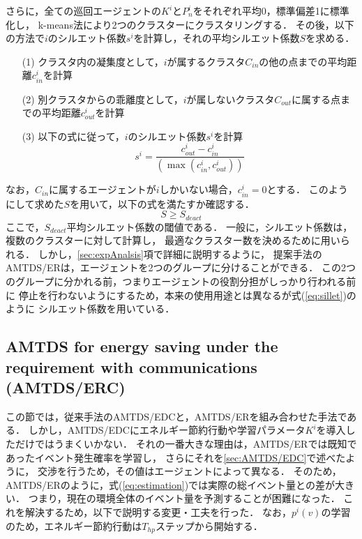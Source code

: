 \documentclass[12pt,a4j,twoside]{jarticle}
\begin{document}
  さらに，全ての巡回エージェントの$K^i$と$P^i_n$をそれぞれ平均0，標準偏差1に標準化し，
  k-means法により2つのクラスターにクラスタリングする．
  その後，以下の方法で$i$のシルエット係数$s^i$を計算し，それの平均シルエット係数$S$を求める．
  \begin{enumerate}
    \item[(1)] クラスタ内の凝集度として，$i$が属するクラスタ$C_{in}$の他の点までの平均距離$c^i_{in}$を計算
    \item[(2)] 別クラスタからの乖離度として，$i$が属しないクラスタ$C_{out}$に属する点までの平均距離$c^i_{out}$を計算
    \item[(3)] 以下の式に従って，$i$のシルエット係数$s^i$を計算
                \begin{equation}
                  s^i = \dfrac{c^i_{out} - c^i_{in}}{(\max(c^i_{in}, c^i_{out}))}
                \end{equation}
  \end{enumerate}
  なお，$C_{in}$に属するエージェントが$i$しかいない場合，$c^i_{in} = 0$とする．
  このようにして求めた$S$を用いて，以下の式を満たすか確認する．
    \begin{equation}\label{eq:sillet}
      S \geq S_{deact}
    \end{equation}
  ここで，$S_{deact}$平均シルエット係数の閾値である．
  一般に，シルエット係数は，複数のクラスターに対して計算し，
  最適なクラスター数を決めるために用いられる．
  しかし，\ref{sec:expAnalsis}項で詳細に説明するように，
  提案手法のAMTDS/ERは，エージェントを2つのグループに分けることができる．
  この2つのグループに分かれる前，つまりエージェントの役割分担がしっかり行われる前に
  停止を行わないようにするため，本来の使用用途とは異なるが式(\ref{eq:sillet})のように
  シルエット係数を用いている．
 
  \subsection{AMTDS for energy saving under the requirement with communications (AMTDS/ERC)}
  この節では，従来手法のAMTDS/EDCと，AMTDS/ERを組み合わせた手法である．
  しかし，AMTDS/EDCにエネルギー節約行動や学習パラメータ$K^i$を導入しただけではうまくいかない．
  それの一番大きな理由は，AMTDS/ERでは既知であったイベント発生確率を学習し，
  さらにそれを\ref{sec:AMTDS/EDC}で述べたように，
  交渉を行うため，その値はエージェントによって異なる．
  そのため，AMTDS/ERのように，式(\ref{eq:estimation})では実際の総イベント量との差が大きい．
  つまり，現在の環境全体のイベント量を予測することが困難になった．
  これを解決するため，以下で説明する変更・工夫を行った．
  なお，$p^i(v)$の学習のため，エネルギー節約行動は$T_{hp}$ステップから開始する．
  
\end{document}
